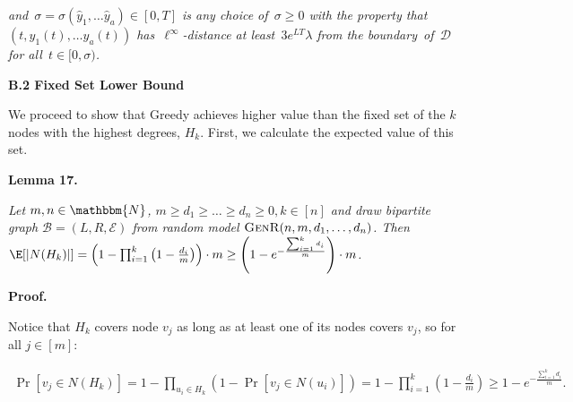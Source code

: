 \emph{and $\sigma=\sigma(\hat{y}_{1},\ldots\hat{y}_{a})\in[0,T]$ is any choice of $\sigma\geq 0$ with the property
that $(t,y_{1}(t),\ldots y_{a}(t))$ has $\ell^{\infty}$-distance at least $3e^{LT}\lambda$
from the boundary of $\mathcal{D}$ for all $t\in[0,\sigma)$.}\par








\par\medskip\noindent\textbf{B.2 Fixed Set Lower Bound}\par




We proceed to show that Greedy achieves higher value than the fixed set of the $k$ nodes with the highest degrees, $H_{k}$. First, we calculate the expected value of this set.\par





\par\medskip\noindent\textbf{\textbf{Lemma 17}\textbf{.}}\par



\emph{Let $m,n\in\mathbbm{N}$, $m\geq d_{1}\geq\dots\geq d_{n}\geq 0,k\in[n]$ and draw bipartite graph $\mathcal{B}=(L,R,\mathcal{E})$ from random model $\textsc{GenR}(n,m,d_{1},\dots,d_{n})$.
Then $\E[|N(H_{k})|]=\left(1-\prod_{i=1}^{k}\left(1-\frac{d_{i}}{m}\right)\right)\cdot m\geq\left(1-e^{-\frac{\sum_{i=1}^{k}d_{i}}{m}}\right)\cdot m$.}\par






\par\medskip\noindent\textbf{Proof.}\par



Notice that $H_{k}$ covers node $v_{j}$ as long as at least one of its nodes covers $v_{j}$, so for all $j\in[m]$:\par


\[\begin{gathered}
\displaystyle\Pr\left[v_{j}\in N(H_{k})\right]=1-\prod_{u_{i}\in H_{k}}{\left(1-\Pr\left[v_{j}\in N(u_{i})\right]\right)}=1-\prod_{i=1}^{k}{\left(1-\frac{d_{i}}{m}\right)}\geq 1-e^{-\frac{\sum_{i=1}^{k}d_{i}}{m}}.
\end{gathered}\]


